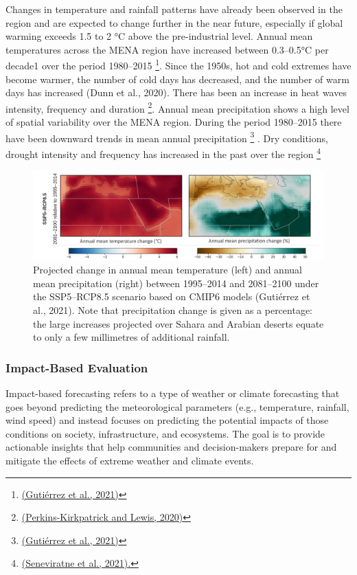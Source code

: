 Changes in temperature and rainfall patterns have already been observed in the region and
are expected to change further in the near future, especially if global warming exceeds 1.5 to
2 °C above the pre-industrial level. Annual mean temperatures across the MENA region
have increased between 0.3–0.5°C per decade1 over the period 1980–2015 \footnote{\href{https://pubs.giss.nasa.gov/abs/gu00200u.html}{(Gutiérrez et al.,
2021)}}. Since the 1950s, hot and cold extremes have become warmer, the number of cold
days has decreased, and the number of warm days has increased (Dunn et al., 2020). There
has been an increase in heat waves intensity, frequency and duration    \footnote{\href{https://www.nature.com/articles/s41467-020-16970-7}{(Perkins-Kirkpatrick
and Lewis, 2020)}}. Annual mean precipitation shows a high level of spatial variability over the
MENA region. During the period 1980–2015 there have been downward trends in mean
annual precipitation \footnote{\href{https://pubs.giss.nasa.gov/abs/gu00200u.html}{(Gutiérrez et al., 2021)}} . Dry conditions, drought intensity and frequency
has increased in the past over the region \footnote{\href{https://www.nature.com/articles/s43247-021-00094-x}{(Seneviratne et al., 2021).}} 


\begin{figure}[H]
	\centering
	\includegraphics[scale=0.25]{actual_vs_past.png}
	\caption{Projected change in annual mean temperature (left) and annual mean precipitation
(right) between 1995–2014 and 2081–2100 under the SSP5–RCP8.5 scenario based on CMIP6
models (Gutiérrez et al., 2021). Note that precipitation change is given as a percentage: the
large increases projected over Sahara and Arabian deserts equate to only a few millimetres of
additional rainfall.}
\end{figure}



\subsubsection{Impact-Based Evaluation}
Impact-based forecasting refers to a type of weather or climate forecasting that goes beyond predicting the meteorological parameters (e.g., temperature, rainfall, wind speed) and instead focuses on predicting the potential impacts of those conditions on society, infrastructure, and ecosystems. The goal is to provide actionable insights that help communities and decision-makers prepare for and mitigate the effects of extreme weather and climate events.

